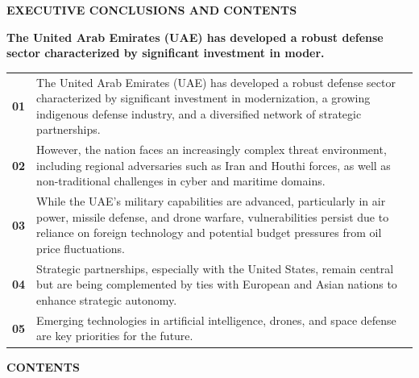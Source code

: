 \documentclass[10pt,a4paper]{article}
\begin{document}
{\textcolor{BOBlue}{\scriptsize\bfseries EXECUTIVE CONCLUSIONS AND CONTENTS}}\par\vspace{-1pt}
{\Large\sffamily\bfseries\color{BONavy} The United Arab Emirates (UAE) has developed a robust defense sector characterized by significant investment in moder.}\par\vspace{4pt}
\vspace{2pt}{\color{BOBright}\rule{\linewidth}{1pt}}\vspace{5pt}
\begin{tabularx}{\linewidth}{p{12mm}Y}
\textcolor{BOBlue}{\bfseries 01} & {\footnotesize The United Arab Emirates (UAE) has developed a robust defense sector characterized by significant investment in modernization, a growing indigenous defense industry, and a diversified network of strategic partnerships.} \\[4pt]
\textcolor{BOBlue}{\bfseries 02} & {\footnotesize However, the nation faces an increasingly complex threat environment, including regional adversaries such as Iran and Houthi forces, as well as non-traditional challenges in cyber and maritime domains.} \\[4pt]
\textcolor{BOBlue}{\bfseries 03} & {\footnotesize While the UAE's military capabilities are advanced, particularly in air power, missile defense, and drone warfare, vulnerabilities persist due to reliance on foreign technology and potential budget pressures from oil price fluctuations.} \\[4pt]
\textcolor{BOBlue}{\bfseries 04} & {\footnotesize Strategic partnerships, especially with the United States, remain central but are being complemented by ties with European and Asian nations to enhance strategic autonomy.} \\[4pt]
\textcolor{BOBlue}{\bfseries 05} & {\footnotesize Emerging technologies in artificial intelligence, drones, and space defense are key priorities for the future.} \\[4pt]
\end{tabularx}
\vspace{6pt}
{\textcolor{BOBlue}{\scriptsize\bfseries CONTENTS}}\par\vspace{2pt}
\end{document}

